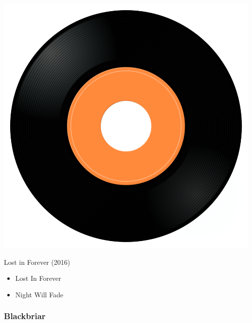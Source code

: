 \begin{minipage}[t]{0.25\textwidth}
\captionsetup{type=figure}
\includegraphics[width=\textwidth]{Images/cover.png}
\caption*{Lost in Forever (2016)}
\end{minipage}
\begin{minipage}[t]{0.25\textwidth}\vspace{0pt}
\begin{itemize}[nosep,leftmargin=1em,labelwidth=*,align=left]
	\setlength{\itemsep}{0pt}
	\item Lost In Forever
	\item Night Will Fade
\end{itemize}
\end{minipage}


\subsubsection{Blackbriar}

